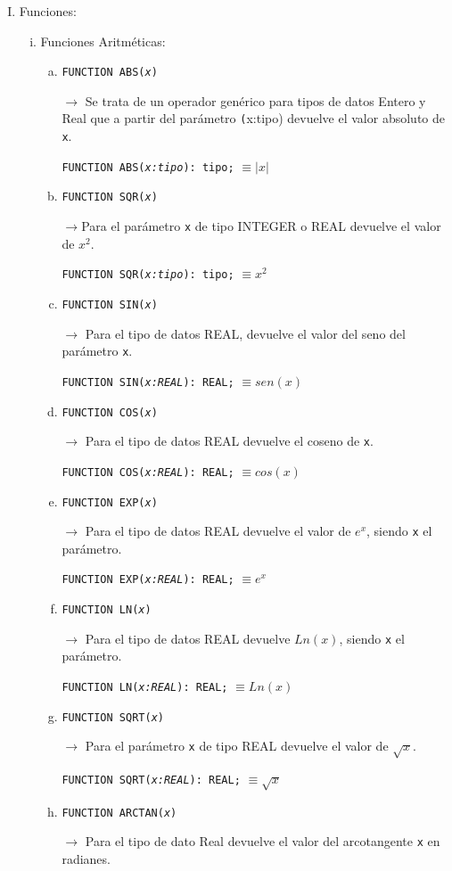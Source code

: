 \begin{enumerate}[I.]
\begin{enumerate}[i.]
\end{enumerate}

\item Funciones:

\begin{enumerate}[i.]

\item {}Funciones Aritméticas:
\begin{enumerate}[a.]

\item \texttt{FUNCTION ABS(\textit{x})}{ $\rightarrow$ Se trata de un operador
genérico para tipos de datos Entero y Real que a partir del parámetro
\texttt(x:tipo) devuelve el valor absoluto de \texttt{x}.

\form \texttt{FUNCTION ABS(\textit{x:tipo}): tipo;} $\equiv |x|$
}
\item \texttt{FUNCTION SQR(\textit{x})}{ $\rightarrow$Para el parámetro
\texttt{x} de tipo INTEGER o REAL devuelve el valor de $x^2$.

\form \texttt{FUNCTION SQR(\textit{x:tipo}): tipo;}  $\equiv x^2$
}
\item \texttt{FUNCTION SIN(\textit{x})}{ $\rightarrow$ Para el tipo de datos
REAL, devuelve el valor del seno del parámetro \texttt{x}.

\form \texttt{FUNCTION SIN(\textit{x:REAL}): REAL;}  $\equiv sen(x)$
}
\item \texttt{FUNCTION COS(\textit{x})}{ $\rightarrow$ Para el tipo de datos
REAL devuelve el coseno de \texttt{x}.

\form \texttt{FUNCTION COS(\textit{x:REAL}): REAL;} $\equiv cos(x)$
}
\item \texttt{FUNCTION EXP(\textit{x})}{ $\rightarrow$ Para el tipo de datos
REAL devuelve el valor de $e^x$, siendo \texttt{x} el parámetro.

\form \texttt{FUNCTION EXP(\textit{x:REAL}): REAL;}  $\equiv e^x$
}
\item \texttt{FUNCTION LN(\textit{x})}{ $\rightarrow$ Para el tipo de datos REAL
devuelve $Ln(x)$, siendo \texttt{x} el parámetro.

\form \texttt{FUNCTION LN(\textit{x:REAL}): REAL;}  $\equiv Ln(x)$
}
\item \texttt{FUNCTION SQRT(\textit{x})}{ $\rightarrow$ Para el parámetro
\texttt{x} de tipo REAL devuelve el valor de $\sqrt{x}$.

\form \texttt{FUNCTION SQRT(\textit{x:REAL}): REAL;} $\equiv \sqrt{x}$
}
\item \texttt{FUNCTION ARCTAN(\textit{x})}{ $\rightarrow$ Para el tipo de dato
Real devuelve el valor del arcotangente \texttt{x} en radianes.

}
\end{enumerate}
\end{enumerate}
\end{enumerate}
